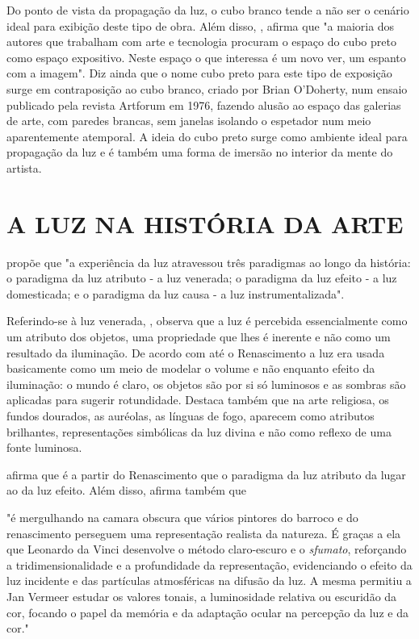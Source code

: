 Do ponto de vista da propagação da luz, o cubo branco tende a não ser o cenário ideal para exibição deste tipo de obra. Além disso, , afirma que "a maioria dos autores que trabalham com arte e tecnologia procuram o espaço do cubo preto como espaço expositivo. Neste espaço o que interessa é um novo ver, um espanto com a imagem". Diz ainda que o nome cubo preto para este tipo de exposição surge em contraposição ao cubo branco, criado por Brian O'Doherty, num ensaio publicado pela revista Artforum em 1976, fazendo alusão ao espaço das galerias de arte, com paredes brancas, sem janelas isolando o espetador num meio aparentemente atemporal. A ideia do cubo preto surge como ambiente ideal para propagação da luz e é também uma forma de imersão no interior da mente do artista.


\section{A LUZ NA HISTÓRIA DA ARTE}

 propõe que "a experiência da luz atravessou três paradigmas ao longo da história: o paradigma da luz atributo - a luz venerada; o paradigma da luz efeito - a luz domesticada; e o paradigma da luz causa - a luz instrumentalizada".

Referindo-se à luz venerada, , observa que a luz é percebida essencialmente como um atributo dos objetos, uma propriedade que lhes é inerente e não como um resultado da iluminação. De acordo com  até o Renascimento a luz era usada basicamente como um meio de modelar o volume e não enquanto efeito da iluminação: o mundo é claro, os objetos são por si só luminosos e as sombras são aplicadas para sugerir rotundidade. Destaca também que na arte religiosa, os fundos dourados, as auréolas, as línguas de fogo, aparecem como atributos brilhantes, representações simbólicas da luz divina e não como reflexo de uma fonte luminosa. 

 afirma que é a partir do Renascimento que o paradigma da luz atributo da lugar ao da luz efeito. Além disso, afirma também que 

"é mergulhando na camara obscura que vários pintores do barroco e do renascimento perseguem uma representação realista da natureza. É graças a ela que Leonardo da Vinci desenvolve o método claro-escuro e o \textit{sfumato}, reforçando a tridimensionalidade e a profundidade da representação, evidenciando o efeito da luz incidente e das partículas atmosféricas na difusão da luz. A mesma permitiu a Jan Vermeer estudar os valores tonais, a luminosidade relativa ou escuridão da cor, focando o papel da memória e da adaptação ocular na percepção da luz e da cor."


